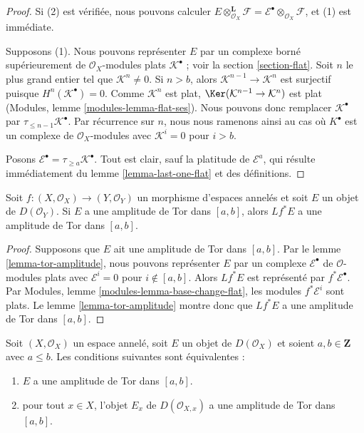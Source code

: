 \begin{proof}
Si (2) est vérifiée, nous pouvons calculer $E \otimes_{\mathcal{O}_X}^\mathbf{L} \mathcal{F} =
\mathcal{E}^\bullet \otimes_{\mathcal{O}_X} \mathcal{F}$, et (1) est immédiate.

\medskip\noindent

Supposons (1). Nous pouvons représenter $E$ par un complexe borné supérieurement de $\mathcal{O}_X$-modules plats $\mathcal{K}^\bullet$ ; voir la section \ref{section-flat}. Soit $n$ le plus grand entier tel que $\mathcal{K}^n \not = 0$. Si $n > b$, alors $\mathcal{K}^{n - 1} \to \mathcal{K}^n$ est surjectif puisque
$H^n(\mathcal{K}^\bullet) = 0$. Comme $\mathcal{K}^n$ est plat,
$\Ker(\mathcal{K}^{n - 1} \to \mathcal{K}^n)$ est plat (Modules, lemme \ref{modules-lemma-flat-ses}). Nous pouvons donc remplacer $\mathcal{K}^\bullet$ par
$\tau_{\leq n - 1}\mathcal{K}^\bullet$. Par récurrence sur $n$, nous nous ramenons ainsi au cas où $K^\bullet$ est un complexe de
$\mathcal{O}_X$-modules avec $\mathcal{K}^i = 0$ pour $i > b$.

\medskip\noindent

Posons $\mathcal{E}^\bullet = \tau_{\geq a}\mathcal{K}^\bullet$. Tout est clair, sauf la platitude de $\mathcal{E}^a$, qui résulte immédiatement du lemme \ref{lemma-last-one-flat}
et des définitions.

\end{proof}

\begin{lemma}

\label{lemma-tor-amplitude-pullback}
Soit $f : (X, \mathcal{O}_X) \to (Y, \mathcal{O}_Y)$ un morphisme d'espaces annelés et soit $E$ un objet de $D(\mathcal{O}_Y)$. Si $E$ a une amplitude de Tor dans $[a, b]$, alors $Lf^*E$ a une amplitude de Tor dans $[a, b]$.
\end{lemma}

\begin{proof}
Supposons que $E$ ait une amplitude de Tor dans $[a, b]$. Par le lemme \ref{lemma-tor-amplitude}, nous pouvons représenter $E$ par un complexe $\mathcal{E}^\bullet$ de $\mathcal{O}$-modules plats avec $\mathcal{E}^i = 0$ pour $i \not \in [a, b]$. Alors $Lf^*E$ est représenté par $f^*\mathcal{E}^\bullet$. Par Modules, lemme \ref{modules-lemma-base-change-flat}, les modules $f^*\mathcal{E}^i$ sont plats. Le lemme \ref{lemma-tor-amplitude} montre donc que $Lf^*E$ a une amplitude de Tor dans $[a, b]$.
\end{proof}

\begin{lemma}

\label{lemma-tor-amplitude-stalk}
Soit $(X, \mathcal{O}_X)$ un espace annelé, soit $E$ un objet de $D(\mathcal{O}_X)$ et soient $a, b \in \mathbf{Z}$ avec $a \leq b$. Les conditions suivantes sont équivalentes :
\begin{enumerate}
\item $E$ a une amplitude de Tor dans $[a, b]$.
\item pour tout $x \in X$, l'objet $E_x$ de $D(\mathcal{O}_{X, x})$ a une amplitude de Tor dans $[a, b]$.
\end{enumerate}

\end{lemma}

